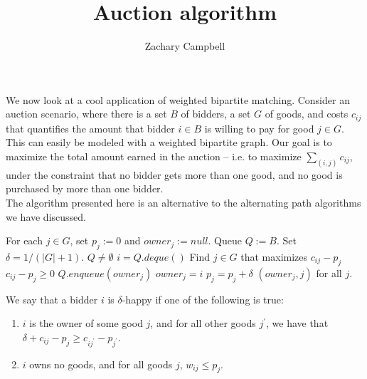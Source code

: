 \documentclass[11pt]{article}
\renewcommand{\'}{^{'}}
\renewcommand{\gets}{:=}
\newenvironment{definition}[2][Definition]{\begin{trivlist}
\item[\hskip \labelsep {\bfseries #1}\hskip \labelsep {\bfseries #2.}]}{\end{trivlist}}
\begin{document}
\title{Auction algorithm}
\author{Zachary Campbell}

\maketitle

We now look at a cool application of weighted bipartite matching. Consider an auction scenario, where 
there is a set $B$ of bidders, a set $G$ of goods, and costs $c_{ij}$ that quantifies the amount 
that bidder $i\in B$ is willing to pay for good $j\in G$. This can easily be modeled with a 
weighted bipartite graph. Our goal is to maximize the total amount earned in the auction -- i.e. to 
maximize $\sum_{(i,j)} c_{ij}$, under the constraint that no bidder gets more than one good, and no 
good is purchased by more than one bidder. \\
The algorithm presented here is an alternative to the alternating path algorithms we have discussed. 

\begin{codebox}
	\li For each $j\in G$, set $p_j \gets 0$ and $owner_j \gets null$.
	\li Queue $Q \gets B$.
	\li Set $\delta = 1/(|G| + 1)$.
	\li \While $Q\neq \emptyset$
		\Do
	\li		$i = Q.deque()$
	\li		Find $j\in G$ that maximizes $c_{ij} - p_{j}$
	\li		\If $c_{ij} - p_{j} \geq 0$
				\Then
	\li				$Q.enqueue(owner_j)$
	\li				$owner_j = i$
	\li				$p_j = p_j + \delta$
				\End
		\End
	\li \Return $(owner_j,j)$ for all $j$.
\end{codebox}

\begin{definition}{}
	We say that a bidder $i$ is $\delta$-happy if one of the following is true:
	\begin{enumerate}
		\item $i$ is the owner of some good $j$, and for all other goods $j\'$, we have that 
			$\delta + c_{ij} - p_j \geq c_{ij\'} - p_{j\'}$.
		\item $i$ owns no goods, and for all goods $j$, $w_{ij} \leq p_j$.
	\end{enumerate}
\end{definition}
\end{document}
